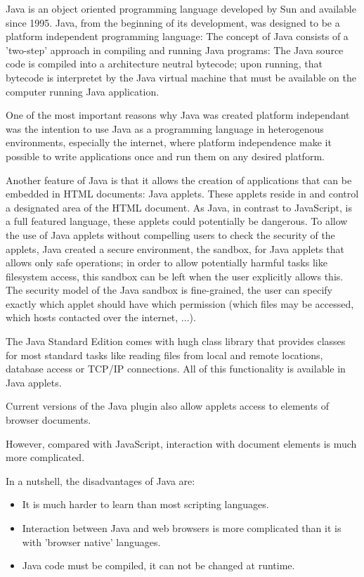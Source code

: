 Java is an object oriented programming language developed by Sun and available since 1995. Java, from the beginning of its development, was designed to be a platform independent programming language: The concept of Java consists of a 'two-step' approach in compiling and running Java programs: The Java source code is compiled into a architecture neutral bytecode; upon running, that bytecode is interpretet by the Java virtual machine that must be available on the computer running Java application.

One of the most important reasons why Java was created platform independant was the intention to use Java as a programming language in heterogenous environments, especially the internet, where platform independence make it possible to write applications once and run them on any desired platform.


Another feature of Java is that it allows the creation of applications that can be embedded in HTML documents: Java applets. These applets reside in and control a designated area of the HTML document. As Java, in contrast to JavaScript, is a full featured language, these applets could potentially be dangerous. To allow the use of Java applets without compelling users to check the security of the applets, Java created a secure environment, the sandbox, for Java applets that allows only safe operations; in order to allow potentially harmful tasks like filesystem access, this sandbox can be left when the user explicitly allows this. The security model of the Java sandbox is fine-grained, the user can specify exactly which applet should have which permission (which files may be accessed, which hosts contacted over the internet, ...). 

The Java Standard Edition comes with hugh class library that provides classes for most standard tasks like reading files from local and remote locations, database access or TCP/IP connections. All of this functionality is available in Java applets.


Current versions of the Java plugin also allow applets access to elements of browser documents. 

However, compared with JavaScript, interaction with document elements is much more complicated. 




In a nutshell, the disadvantages of Java are:

\begin{itemize}
	\item It is much harder to learn than most scripting languages.
	\item Interaction between Java and web browsers is more complicated than it is with 'browser native' languages.
	\item Java code must be compiled, it can not be changed at runtime.
	
\end{itemize}

